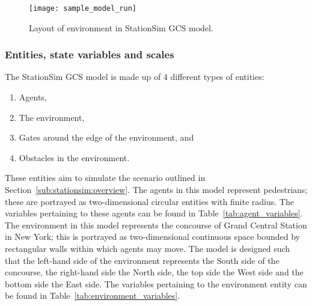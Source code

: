 \begin{figure}[h]
    \centering
    \texttt{[image: sample\_model\_run]}
    \caption{Layout of environment in StationSim GCS
    model.}\label{fig:stationsim_gcs_env}
\end{figure}

\subsubsection{Entities, state variables and
scales}\label{subs:stationsim:overview:entities}

The StationSim GCS model is made up of 4 different types of entities:
\begin{enumerate}
    \item Agents,
    \item The environment,
    \item Gates around the edge of the environment, and
    \item Obstacles in the environment.
\end{enumerate}
These entities aim to simulate the scenario outlined in
Section~\ref{sub:stationsim:overview}.
The agents in this model represent pedestrians; these are portrayed as
two-dimensional circular entities with finite radius.
The variables pertaining to these agents can be found in
Table~\ref{tab:agent_variables}.
The environment in this model represents the concourse of Grand Central Station
in New York; this is portrayed as two-dimensional continuous space bounded by
rectangular walls within which agents may move.
The model is designed such that the left-hand side of the environment
represents the South side of the concourse, the right-hand side the North side,
the top side the West side and the bottom side the East side.
The variables pertaining to the environment entity can be found in
Table~\ref{tab:environment_variables}.

